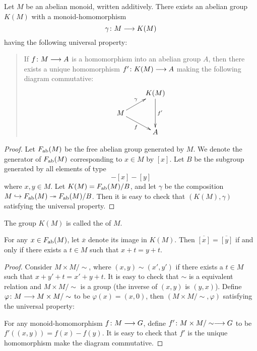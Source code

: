   \begin{prop}
    Let $M$ be an abelian monoid, written additively. There exists an abelian group $K(M)$ with a monoid-homomorphism
    \begin{equation*}
      \gamma\colon M\longrightarrow K(M)
    \end{equation*}
    having the following universal property:
    \begin{quote}
      If $f\colon M\longrightarrow A$ is a homomorphism into an abelian group $A$, then there exists a unique homomorphism $f'\colon K(M)\longrightarrow A$ making the following diagram commutative:
      \begin{displaymath}
        \xymatrix@R=0.5cm{
                &         K(M) \ar[dd]^{f'}     \\
              M \ar[ur]^{\gamma} \ar[dr]_{f}                 \\
                &         A                 }
      \end{displaymath}
    \end{quote}
  \end{prop}
  \begin{proof}
    Let $F_{\operatorname{ab}}(M)$ be the free abelian group generated by $M$. We denote the generator of $F_{\operatorname{ab}}(M)$ corresponding to $x\in M$ by $[x]$. Let $B$ be the subgroup generated by all elements of type
    \begin{equation*}
      [x+y]-[x]-[y]
    \end{equation*}
    where $x,y\in M$. Let $K(M)=F_{\operatorname{ab}}(M)/B$, and let $\gamma$ be the composition $M\hookrightarrow F_{\operatorname{ab}}(M)\twoheadrightarrow F_{\operatorname{ab}}(M)/B$. Then it is easy to check that $(K(M),\gamma)$ satisfying the universal property.
  \end{proof}
  The group $K(M)$ is called the  of $M$.

  \begin{prop}
    For any $x\in F_{\operatorname{ab}}(M)$, let $\overline{x}$ denote its image in $K(M)$. Then $\overline{[x]}=\overline{[y]}$ if and only if there exists a $t\in M$ such that $x+t=y+t$.
  \end{prop}
  \begin{proof}
    Consider $M\times M/\sim$, where $(x,y)\sim(x',y')$ if there exists a $t\in M$ such that $x+y'+t=x'+y+t$. It is easy to check that $\sim$ is a equivalent relation and $M\times M/\sim$ is a group (the inverse of $(x,y)$ is $(y,x)$). Define $\varphi\colon M\longrightarrow M\times M/\sim$ to be $\varphi(x)=(x,0)$, then $(M\times M/\sim,\varphi)$ satisfying the universal property:

    For any monoid-homomorphism $f\colon M\longrightarrow G$, define $f'\colon M\times M/\sim\longrightarrow G$ to be $f'((x,y))=f(x)-f(y)$. It is easy to check that $f'$ is the unique homomorphism make the diagram commutative.
  \end{proof}

